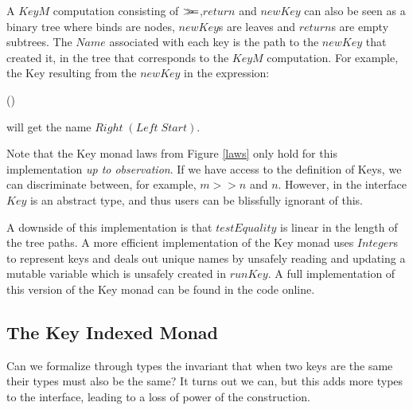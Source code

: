 \documentclass{sigplanconf}
\newcommand{\Conid}[1]{\mathit{#1}}
\newcommand{\Varid}[1]{\mathit{#1}}
\newcommand{\bind}{\mathbin{>\!\!\!>\mkern-6.7mu=}}
\newcommand{\sequ}{\mathbin{>\!\!\!>}}
\def\resethooks{%
  \global\let\SaveRestoreHook\empty
  \global\let\ColumnHook\empty}
\let\hspre\empty
\let\hspost\empty
\begin{document}
A \ensuremath{\Conid{KeyM}} computation consisting of \ensuremath{\bind },\ensuremath{\Varid{return}} and \ensuremath{\Varid{newKey}} can also be seen as a binary tree where binds are nodes, \ensuremath{\Varid{newKey}}s are leaves and \ensuremath{\Varid{return}}s are empty subtrees. The \ensuremath{\Conid{Name}} associated with each key is the path to the \ensuremath{\Varid{newKey}} that created it, in the tree that corresponds to the \ensuremath{\Conid{KeyM}} computation. For example, the Key resulting from the \ensuremath{\Varid{newKey}} in the expression:
\begin{hscode}\SaveRestoreHook
\column{B}{@{}>{\hspre}l<{\hspost}@{}}%
\column{E}{@{}>{\hspre}l<{\hspost}@{}}%
\>[B]{}\Varid{runKeyM}\mathbin{\$}(\Varid{m}\sequ \Varid{newKey})\bind \Varid{f}{}\<[E]%
\ColumnHook
\end{hscode}\resethooks
will get the name \ensuremath{\Conid{Right}\;(\Conid{Left}\;\Conid{Start})}.

Note that the Key monad laws from Figure \ref{laws} only hold for this implementation \emph{up to observation}. If we have access to the definition of Keys, we can discriminate between, for example, \ensuremath{\Varid{m}\sequ \Varid{n}} and \ensuremath{\Varid{n}}. However, in the interface \ensuremath{\Conid{Key}} is an abstract type, and thus users can be blissfully ignorant of this.

A downside of this implementation is that \ensuremath{\Varid{testEquality}} is linear in the length of the tree paths. A more efficient implementation of the Key monad uses \ensuremath{\Conid{Integer}}s to represent keys and deals out unique names by unsafely reading and updating a mutable variable which is unsafely created in \ensuremath{\Varid{runKey}}. A full implementation of this version of the Key monad can be found in the code online.

\subsection{The Key Indexed Monad}

Can we formalize through types the invariant that when two keys are the same their types must also be the same? It turns out we can, but this adds more types to the interface, leading to a loss of power of the construction.
\end{document}
